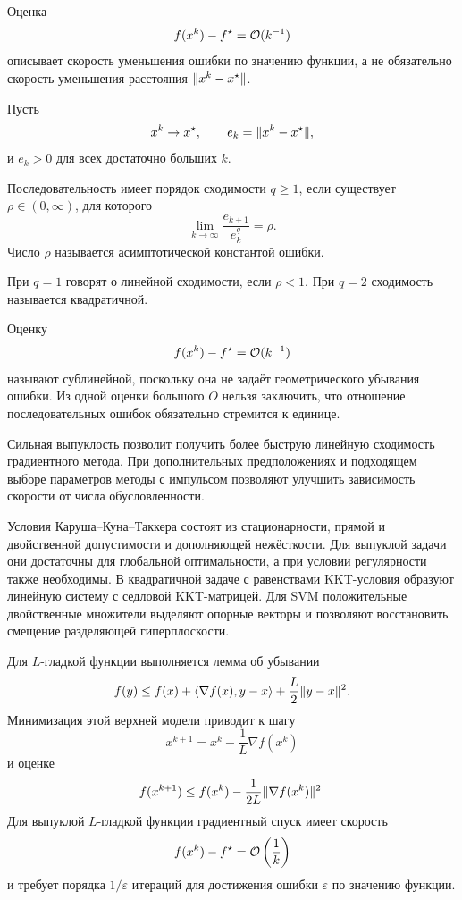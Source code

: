 Оценка
\[
    f(x^k)-f^\star
    =
    \mathcal{O}(k^{-1})
\]
описывает скорость уменьшения ошибки по значению функции, а не
обязательно скорость уменьшения расстояния
\(\lVert x^k-x^\star\rVert\).



Пусть
\[
    x^k\to x^\star,
    \qquad
    e_k=\lVert x^k-x^\star\rVert,
\]
и \(e_k>0\) для всех достаточно больших \(k\).

\begin{definition}
Последовательность имеет порядок сходимости \(q\ge1\), если
существует \(\rho\in(0,\infty)\), для которого
\[
    \lim_{k\to\infty}
    \frac{e_{k+1}}{e_k^q}
    =
    \rho.
\]
Число \(\rho\) называется асимптотической константой ошибки.
\end{definition}

При \(q=1\) говорят о линейной сходимости, если \(\rho<1\).
При \(q=2\) сходимость называется квадратичной.

Оценку
\[
    f(x^k)-f^\star=\mathcal{O}(k^{-1})
\]
называют сублинейной, поскольку она не задаёт геометрического
убывания ошибки. Из одной оценки большого \(O\) нельзя заключить, что
отношение последовательных ошибок обязательно стремится к единице.

Сильная выпуклость позволит получить более быструю линейную
сходимость градиентного метода. При дополнительных предположениях и подходящем выборе параметров
методы с импульсом позволяют улучшить зависимость скорости от числа
обусловленности.

\begin{lecturesummary}
Условия Каруша--Куна--Таккера состоят из стационарности, прямой и
двойственной допустимости и дополняющей нежёсткости. Для выпуклой
задачи они достаточны для глобальной оптимальности, а при условии
регулярности также необходимы. В квадратичной задаче с равенствами
KKT-условия образуют линейную систему с седловой KKT-матрицей. Для
SVM положительные двойственные множители выделяют опорные векторы и
позволяют восстановить смещение разделяющей гиперплоскости.

Для \(L\)-гладкой функции выполняется лемма об убывании
\[
    f(y)
    \le
    f(x)
    +
    \left\langle \nabla f(x),y-x \right\rangle
    +
    \frac{L}{2}\lVert y-x\rVert^2.
\]
Минимизация этой верхней модели приводит к шагу
\[
    x^{k+1}
    =
    x^k-\frac1L\nabla f(x^k)
\]
и оценке
\[
    f(x^{k+1})
    \le
    f(x^k)
    -
    \frac{1}{2L}
    \lVert\nabla f(x^k)\rVert^2.
\]
Для выпуклой \(L\)-гладкой функции градиентный спуск имеет скорость
\[
    f(x^k)-f^\star
    =
    \mathcal{O}\left(\frac1k\right)
\]
и требует порядка \(1/\varepsilon\) итераций для достижения ошибки
\(\varepsilon\) по значению функции.
\end{lecturesummary}